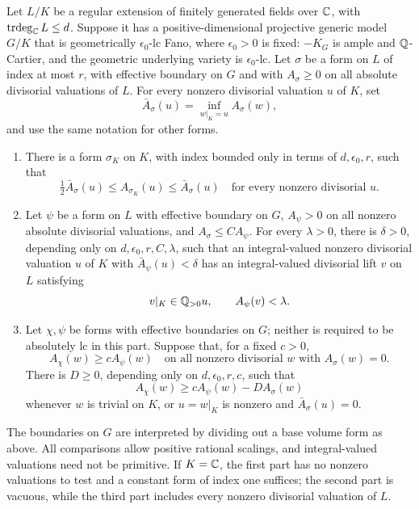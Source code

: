 \begin{theorem}
\label{thm:bounded-fibre}
Let $L/K$ be a regular extension of finitely generated fields over
$\mathbb C$, with $\operatorname{trdeg}_{\mathbb C}L\le d$.
Suppose it has a positive-dimensional projective generic model
$G/K$ that is geometrically $\epsilon_0$-lc Fano, where
$\epsilon_0>0$ is fixed: $-K_G$ is ample and $\mathbb Q$-Cartier, and
the geometric underlying variety is $\epsilon_0$-lc.
Let $\sigma$ be a form on $L$ of index at most $r$, with effective
boundary on $G$ and with $A_\sigma\ge0$ on all absolute divisorial
valuations of $L$.  For every nonzero divisorial valuation $u$ of
$K$, set
\[
 \bar A_\sigma(u)=\inf_{w|_K=u}A_\sigma(w),
\]
and use the same notation for other forms.
\begin{enumerate}[label=\textup{(\arabic*)}]
\item\label{tower:bounded-reference}
There is a form $\sigma_K$ on $K$, with index bounded only in
terms of $d,\epsilon_0,r$, such that
\[
 \tfrac12\bar A_\sigma(u)
 \le A_{\sigma_K}(u)\le\bar A_\sigma(u)
 \quad\text{for every nonzero divisorial }u.
\]
\item\label{tower:bounded-lift}
Let $\psi$ be a form on $L$ with effective boundary on $G$,
$A_\psi>0$ on all nonzero absolute divisorial valuations, and
$A_\sigma\le C A_\psi$.  For every $\lambda>0$, there is
$\delta>0$, depending only on $d,\epsilon_0,r,C,\lambda$, such
that an integral-valued nonzero divisorial valuation $u$ of $K$
with $\bar A_\psi(u)<\delta$ has an integral-valued divisorial
lift $v$ on $L$ satisfying
\[
 v|_K\in\mathbb Q_{>0}u,\qquad A_\psi(v)<\lambda.
\]
\item\label{tower:bounded-mixture}
Let $\chi,\psi$ be forms with effective boundaries on $G$;
neither is required to be absolutely lc in this part.
Suppose that, for a fixed $c>0$,
\[
 A_\chi(w)\ge cA_\psi(w)
 \quad\text{on all nonzero divisorial }w
 \text{ with }A_\sigma(w)=0.
\]
There is $D\ge0$, depending only on $d,\epsilon_0,r,c$, such that
\begin{equation}
\label{tower:bounded-mixture-inequality}
 A_\chi(w)\ge cA_\psi(w)-D A_\sigma(w)
\end{equation}
whenever $w$ is trivial on $K$, or $u=w|_K$ is nonzero and
$\bar A_\sigma(u)=0$.
\end{enumerate}
The boundaries on $G$ are interpreted by dividing out a base
volume form as above.  All comparisons allow positive rational
scalings, and integral-valued valuations need not be primitive.
If $K=\mathbb C$, the first part has no nonzero valuations to test and a
constant form of index one suffices; the second part is vacuous,
while the third part includes every nonzero divisorial valuation
of $L$.
\end{theorem}

